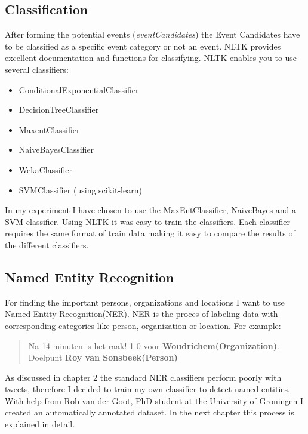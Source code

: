 \documentclass[
10pt, %
a4paper, %
oneside, %
headinclude,footinclude, %
BCOR5mm, %
]{scrartcl}
\begin{document}
\newpage
\subsection{Classification}
After forming the potential events (\textit{eventCandidates}) the Event Candidates have to be classified as a specific event category or not an event.  NLTK provides excellent documentation and functions for classifying. \newline  NLTK enables you to use several classifiers:

\begin{itemize}[noitemsep]
\item ConditionalExponentialClassifier
\item DecisionTreeClassifier
\item MaxentClassifier
\item NaiveBayesClassifier
\item WekaClassifier
\item SVMClassifier (using scikit-learn)
\end{itemize}
In my experiment I have chosen to use the MaxEntClassifier, NaiveBayes and a SVM classifier. Using NLTK it was easy to train the classifiers. Each classifier requires the same format of train data making it easy to compare the results of the different classifiers.

\subsection{Named Entity Recognition}
For finding the important persons, organizations and locations I want to use Named Entity Recognition(NER). NER is the proces of labeling data with corresponding categories like person, organization or location. For example:

\begin {quote}
Na 14 minuten is het raak! 1-0 voor \textbf{Woudrichem(Organization)}. Doelpunt \textbf{Roy van Sonsbeek(Person)}
\end{quote}

As discussed in chapter 2 the standard NER classifiers perform poorly with tweets, therefore I decided to train my own classifier to detect named entities. With help from Rob van der Goot, PhD student at the University of Groningen I created an automatically annotated dataset. In the next chapter this process is explained in detail.
\newpage
\end{document}
